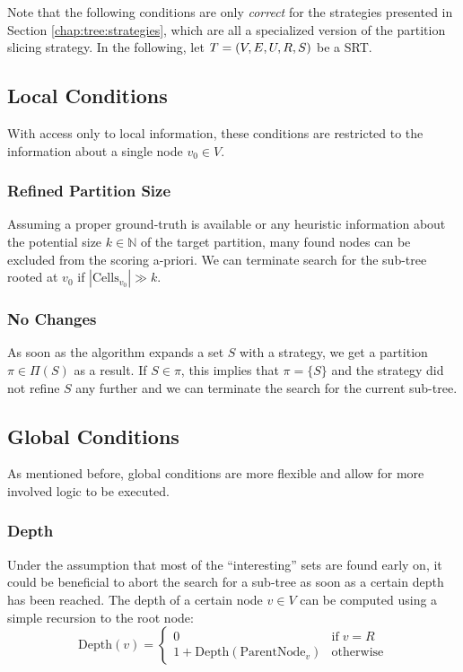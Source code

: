 		Note that the following conditions are only \textit{correct} for the strategies presented in Section \ref{chap:tree:strategies}, which are all a specialized version of the partition slicing strategy.
		In the following, let $T = (V, E, U, R, S)$ be a \ac{SRT}.
		
		\subsection{Local Conditions}
		
			With access only to local information, these conditions are restricted to the information about a single node $v_0 \in V$.
			
			\subsubsection{Refined Partition Size}
			
			Assuming a proper ground-truth is available or any heuristic information about the potential size $k \in \mathbb{N}$ of the target partition, many found nodes can be excluded from the scoring a-priori. 
			We can terminate search for the sub-tree rooted at $v_0$ if $| \mathrm{Cells}_{v_0} | \gg k$.
			
			\subsubsection{No Changes}
			
			As soon as the algorithm expands a set $S$ with a strategy, we get a partition $\pi \in \Pi(S)$ as a result.
			If $S \in \pi$, this implies that $\pi = \{ S \}$ and the strategy did not refine $S$ any further and we can terminate the search for the current sub-tree.
			
		\subsection{Global Conditions}
			
			As mentioned before, global conditions are more flexible and allow for more involved logic to be executed.
			
			\subsubsection{Depth}
			
				Under the assumption that most of the \enquote{interesting} sets are found early on, it could be beneficial to abort the search for a sub-tree as soon as a certain depth has been reached.
				The depth of a certain node $v \in V$ can be computed using a simple recursion to the root node:
				\begin{equation*}
					\mathrm{Depth}(v) = \begin{cases}
						0 & \text{if} \; v = R \\
						1 + \mathrm{Depth}(\mathrm{ParentNode}_v) & \mathrm{otherwise}
					\end{cases}
				\end{equation*}
			
